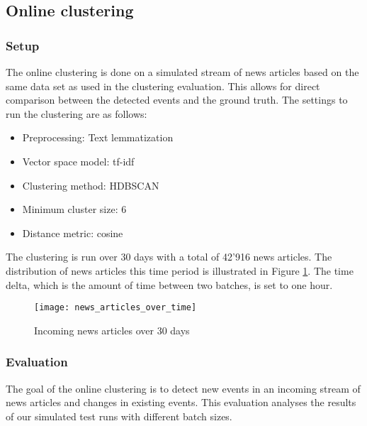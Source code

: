 \subsection{Online clustering}
\label{sec:online_clustering}

\subsubsection{Setup}

The online clustering is done on a simulated stream of news articles based on the same data set as used in the clustering evaluation. This allows for direct comparison between the detected events and the ground truth. The settings to run the clustering are as follows:

\begin{itemize}
    \item Preprocessing: Text lemmatization
    \item Vector space model: tf-idf
    \item Clustering method: HDBSCAN
    \item Minimum cluster size: 6
    \item Distance metric: cosine
\end{itemize}

The clustering is run over 30 days with a total of 42'916 news articles. The distribution of news articles this time period is illustrated in Figure \ref{fig:news_articles_over_time}. The time delta, which is the amount of time between two batches, is set to one hour. 

\begin{figure}[h]
    \centering
    \texttt{[image: news\_articles\_over\_time]}
    \caption{Incoming news articles over 30 days}
    \label{fig:news_articles_over_time}
\end{figure}

\subsubsection{Evaluation}

The goal of the online clustering is to detect new events in an incoming stream of news articles and changes in existing events. This evaluation analyses the results of our simulated test runs with different batch sizes.


